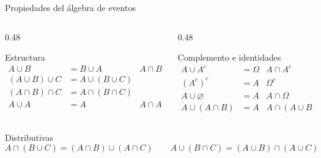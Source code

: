 \documentclass[aspectratio=169,10pt]{beamer}
\begin{document}
\begin{frame}{Propiedades del álgebra de eventos}
  \small
  \begin{columns}[T,onlytextwidth]
    \begin{column}{0.48\textwidth}
      \begin{block}{Estructura}
        \begin{align*}
          A\cup B &= B\cup A & A\cap B &= B\cap A\\
          (A\cup B)\cup C &= A\cup(B\cup C) \\
          (A\cap B)\cap C &= A\cap(B\cap C) \\
          A\cup A &= A & A\cap A &= A
        \end{align*}
      \end{block}
    \end{column}
    \begin{column}{0.48\textwidth}
      \begin{block}{Complemento e identidades}
        \begin{align*}
          A\cup A^{c} &= \Omega & A\cap A^{c} &= \varnothing\\
          (A^{c})^{c} &= A &  \Omega^{c} &= \varnothing\\
          A\cup\varnothing &= A & A\cap\Omega &= A\\
          A\cup(A\cap B) &= A & A\cap(A\cup B) &= A
        \end{align*}
      \end{block}
    \end{column}
  \end{columns}

  \vspace{0.15cm}
  \begin{exampleblock}{Distributivas}
    \[ A\cap(B\cup C)=(A\cap B)\cup(A\cap C) \qquad
       A\cup(B\cap C)=(A\cup B)\cap(A\cup C) \]
  \end{exampleblock}
\end{frame}
\end{document}
